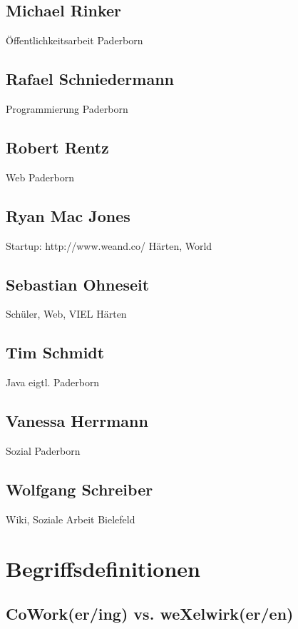 \begin{appendix}
\section{Michael Rinker}
Öffentlichkeitsarbeit
Paderborn

\section{Rafael Schniedermann}
Programmierung
Paderborn

\section{Robert Rentz}
Web
Paderborn

\section{Ryan Mac Jones}
Startup: http://www.weand.co/
Härten, World

\section{Sebastian Ohneseit}
Schüler, Web, VIEL
Härten

\section{Tim Schmidt}
Java
eigtl. Paderborn

\section{Vanessa Herrmann}
Sozial
Paderborn

\section{Wolfgang Schreiber}
Wiki, Soziale Arbeit
Bielefeld

\chapter{Begriffsdefinitionen}
  \section{CoWork(er/ing) vs. weXelwirk(er/en)}

\end{appendix}